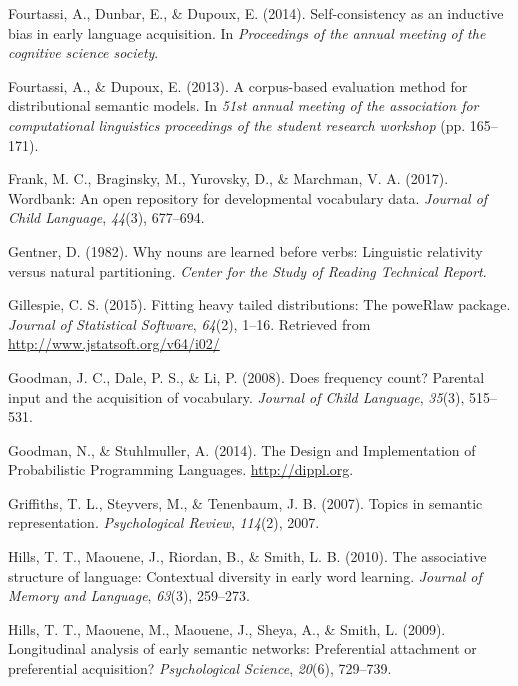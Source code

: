 \documentclass[english,,man,floatsintext]{apa6}
\begin{document}
\leavevmode\hypertarget{ref-fourtassi2014}{}%
Fourtassi, A., Dunbar, E., \& Dupoux, E. (2014). Self-consistency as an inductive bias in early language acquisition. In \emph{Proceedings of the annual meeting of the cognitive science society}.

\leavevmode\hypertarget{ref-fourtassi2013}{}%
Fourtassi, A., \& Dupoux, E. (2013). A corpus-based evaluation method for distributional semantic models. In \emph{51st annual meeting of the association for computational linguistics proceedings of the student research workshop} (pp. 165--171).

\leavevmode\hypertarget{ref-frank2017}{}%
Frank, M. C., Braginsky, M., Yurovsky, D., \& Marchman, V. A. (2017). Wordbank: An open repository for developmental vocabulary data. \emph{Journal of Child Language}, \emph{44}(3), 677--694.

\leavevmode\hypertarget{ref-gentner1982}{}%
Gentner, D. (1982). Why nouns are learned before verbs: Linguistic relativity versus natural partitioning. \emph{Center for the Study of Reading Technical Report}.

\leavevmode\hypertarget{ref-gillespie15}{}%
Gillespie, C. S. (2015). Fitting heavy tailed distributions: The poweRlaw package. \emph{Journal of Statistical Software}, \emph{64}(2), 1--16. Retrieved from \url{http://www.jstatsoft.org/v64/i02/}

\leavevmode\hypertarget{ref-goodman2008}{}%
Goodman, J. C., Dale, P. S., \& Li, P. (2008). Does frequency count? Parental input and the acquisition of vocabulary. \emph{Journal of Child Language}, \emph{35}(3), 515--531.

\leavevmode\hypertarget{ref-dippl}{}%
Goodman, N., \& Stuhlmuller, A. (2014). The Design and Implementation of Probabilistic Programming Languages. \url{http://dippl.org}.

\leavevmode\hypertarget{ref-griffiths07}{}%
Griffiths, T. L., Steyvers, M., \& Tenenbaum, J. B. (2007). Topics in semantic representation. \emph{Psychological Review}, \emph{114}(2), 2007.

\leavevmode\hypertarget{ref-hills2010}{}%
Hills, T. T., Maouene, J., Riordan, B., \& Smith, L. B. (2010). The associative structure of language: Contextual diversity in early word learning. \emph{Journal of Memory and Language}, \emph{63}(3), 259--273.

\leavevmode\hypertarget{ref-hills2009}{}%
Hills, T. T., Maouene, M., Maouene, J., Sheya, A., \& Smith, L. (2009). Longitudinal analysis of early semantic networks: Preferential attachment or preferential acquisition? \emph{Psychological Science}, \emph{20}(6), 729--739.
\end{document}
